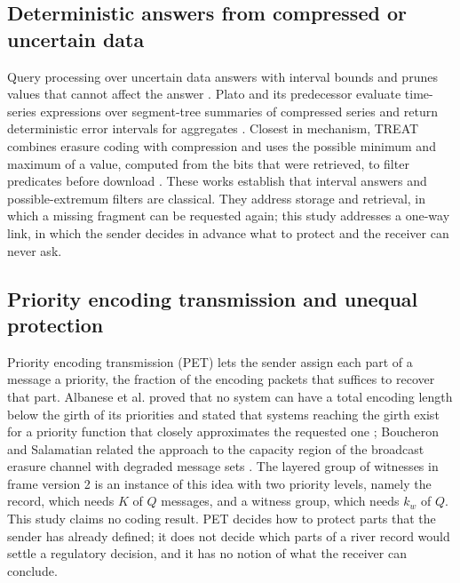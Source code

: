 \subsection{Deterministic answers from compressed or uncertain data}
Query processing over uncertain data answers with interval bounds and prunes values that cannot affect the answer \citep{cheng2003probabilistic}. Plato and its predecessor evaluate time-series expressions over segment-tree summaries of compressed series and return deterministic error intervals for aggregates \citep{brito2017platodb,lin2019plato}. Closest in mechanism, TREAT combines erasure coding with compression and uses the possible minimum and maximum of a value, computed from the bits that were retrieved, to filter predicates before download \citep{taurone2024treat}. These works establish that interval answers and possible-extremum filters are classical. They address storage and retrieval, in which a missing fragment can be requested again; this study addresses a one-way link, in which the sender decides in advance what to protect and the receiver can never ask.

\subsection{Priority encoding transmission and unequal protection}
Priority encoding transmission (PET) lets the sender assign each part of a message a priority, the fraction of the encoding packets that suffices to recover that part. Albanese et al. proved that no system can have a total encoding length below the girth of its priorities and stated that systems reaching the girth exist for a priority function that closely approximates the requested one \citep{albanese1996}; Boucheron and Salamatian related the approach to the capacity region of the broadcast erasure channel with degraded message sets \citep{boucheron2000pet}. The layered group of witnesses in frame version 2 is an instance of this idea with two priority levels, namely the record, which needs $K$ of $Q$ messages, and a witness group, which needs $k_w$ of $Q$. This study claims no coding result. PET decides how to protect parts that the sender has already defined; it does not decide which parts of a river record would settle a regulatory decision, and it has no notion of what the receiver can conclude.


